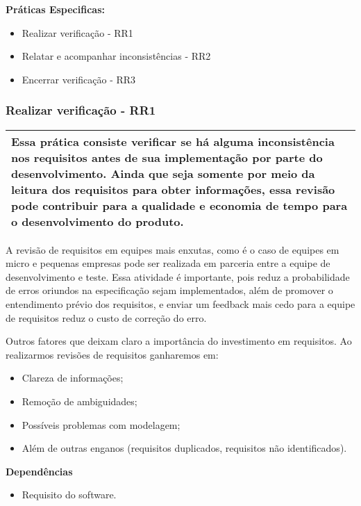 \textbf{Práticas Especificas:}
\begin{itemize}
    \item Realizar verificação - RR1
    \item Relatar e acompanhar inconsistências - RR2
    \item Encerrar verificação - RR3
\end{itemize}

\subsubsection{Realizar verificação - RR1}
\label{sec:realverificacao}

\begin{table}[!ht]
\centering
\begin{tabular}{|p{130mm}|}
\hline
Essa prática consiste verificar se há alguma inconsistência nos requisitos antes de sua implementação por parte do desenvolvimento. Ainda que seja somente por meio da leitura dos requisitos para obter informações, essa revisão pode contribuir para a qualidade e economia de tempo para o desenvolvimento do produto. \\ 
\hline
\end{tabular}
\end{table}

A revisão de requisitos em equipes mais enxutas, como é o caso de equipes em micro e pequenas empresas pode ser realizada em parceria entre a equipe de desenvolvimento e teste. Essa atividade é importante, pois reduz a probabilidade de erros oriundos na especificação sejam implementados, além de promover o entendimento prévio dos requisitos, e enviar um feedback mais cedo para a equipe de requisitos reduz o custo de correção do erro.

Outros fatores que deixam claro a importância do investimento em requisitos. Ao realizarmos revisões de requisitos ganharemos em:

\begin{itemize}
    \item Clareza de informações;
    \item Remoção de ambiguidades;
    \item Possíveis problemas com modelagem;
    \item Além de outras enganos (requisitos duplicados, requisitos não identificados).
\end{itemize}

\textbf{Dependências}
\begin{itemize}
    \item Requisito do software.
\end{itemize}

